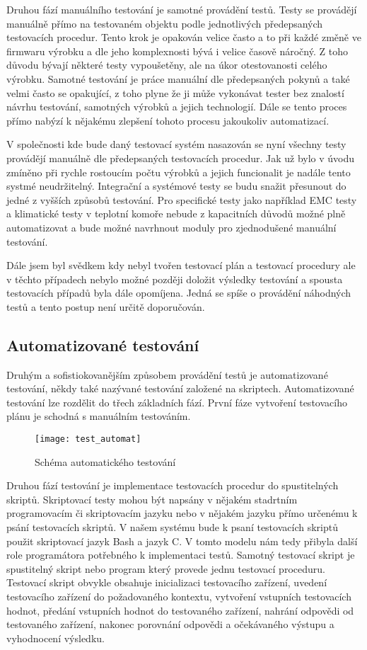 Druhou fází manuálního testování je samotné provádění testů. Testy se provádějí manuálně přímo na testovaném objektu podle jednotlivých předepsaných testovacích procedur. Tento krok je opakován velice často a to při každé změně ve firmwaru výrobku a dle jeho komplexnosti bývá i velice časově náročný. Z toho důvodu bývají některé testy vypoušetěny, ale na úkor otestovanosti celého výrobku. Samotné testování je práce manuální dle předepsaných pokynů a také velmi často se opakující, z toho plyne že ji může vykonávat tester bez znalostí návrhu testování, samotných výrobků a jejich technologií. Dále se tento proces přímo nabýzí k nějakému zlepšení tohoto procesu jakoukoliv automatizací.

V společnosti kde bude daný testovací systém nasazován se nyní všechny testy provádějí manuálně dle předepsaných testovacích procedur. Jak už bylo v úvodu zmíněno při rychle rostoucím počtu výrobků a jejich funcionalit je nadále tento systmé neudržitelný. Integrační a systémové testy se budu snažit přesunout do jedné z vyšších způsobů testování. Pro specifické testy jako například EMC testy a klimatické testy v teplotní komoře nebude z kapacitních důvodů možné plně automatizovat a bude možné navrhnout moduly pro zjednodušené manuální testování.

Dále jsem byl svědkem kdy nebyl tvořen testovací plán a testovací procedury  ale v těchto případech nebylo možné později doložit výsledky testování a spousta testovacích případů byla dále opomíjena. Jedná se spíše o provádění náhodných testů a tento postup není určitě doporučován.

\subsection{Automatizované testování}
Druhým a sofistiokovanějším způsobem provádění testů je automatizované testování, někdy také nazývané testování založené na skriptech. Automatizované testování lze rozdělit do třech základních fází. První fáze vytvoření testovacího plánu je schodná s manuálním testováním.

\begin{figure}[h]
  \centering
  \texttt{[image: test\_automat]}
  \caption{Schéma automatického testování}
  \label{fig:test_automat}
\end{figure}

Druhou fází testování je implementace testovacích procedur do spustitelných skriptů. Skriptovací testy mohou být napsány v nějakém stadrtním programovacím či skriptovacím jazyku nebo v nějakém jazyku přímo určenému k psání testovacích skriptů. V našem systému bude k psaní testovacích skriptů použit skriptovací jazyk Bash a jazyk C. V tomto modelu nám tedy přibyla další role programátora potřebného k implementaci testů. Samotný testovací skript je spustitelný skript nebo program který provede jednu testovací proceduru. Testovací skript obvykle obsahuje inicializaci testovacího zařízení, uvedení testovacího zařízení do požadovaného kontextu, vytvoření vstupních testovacích hodnot, předání vstupních hodnot do testovaného zařízení, nahrání odpovědi od testovaného zařízení, nakonec porovnání odpovědi a očekávaného výstupu a vyhodnocení výsledku.

